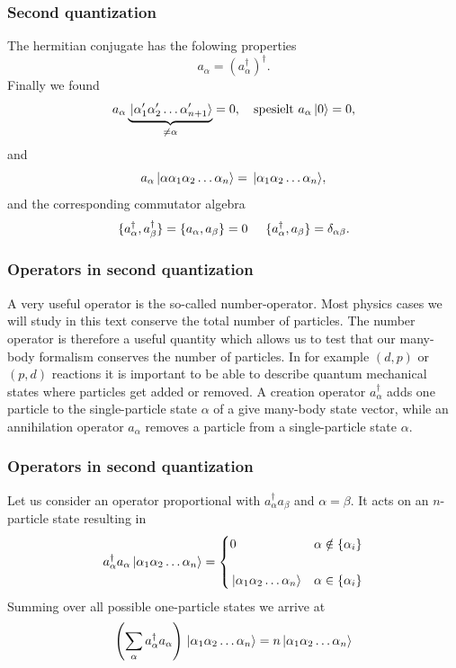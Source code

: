 \frame
{
  \frametitle{Second quantization}
\begin{small}
{\scriptsize
The hermitian conjugate has the folowing properties
\[
        a_{\alpha} = ( a_{\alpha}^\dagger )^\dagger.
\]
Finally we found 
\[
	a_\alpha\underbrace{\,|{\alpha_1'\alpha_2' \dots \alpha_{n+1}'}\rangle}_{\neq \alpha} = 0, \quad
		\textrm{spesielt } a_\alpha \,|{0}\rangle = 0,
\]
and 
\[
 a_\alpha \,|{\alpha\alpha_1\alpha_2 \dots \alpha_{n}}\rangle = \,|{\alpha_1\alpha_2 \dots \alpha_{n}}\rangle,
\]
and the corresponding commutator algebra
\[
	\{a_{\alpha}^\dagger,a_{\beta}^\dagger\} = \{a_{\alpha},a_{\beta}\} = 0 \hspace{0.5cm} 
\{a_\alpha^\dagger,a_\beta \} = \delta_{\alpha\beta}.
\]
}
\end{small}
}

\frame
{
  \frametitle{Operators in second quantization}
\begin{small}
{\scriptsize
A very useful operator is the so-called number-operator.  Most physics cases  we will
study in this text conserve the total number of particles.  The number operator is therefore
a useful quantity which allows us to test that our many-body formalism  conserves the number of particles.
In for example $(d,p)$ or $(p,d)$ reactions it is important to be able to describe quantum mechanical states
where particles get added or removed.
A creation operator $a_\alpha^\dagger$ adds one particle to the single-particle state
$\alpha$ of a give many-body state vector, while an annihilation operator $a_\alpha$ 
removes a particle from a single-particle
state $\alpha$. 
}
\end{small}
}


\frame
{
  \frametitle{Operators in second quantization}
\begin{small}
{\scriptsize
Let us consider an operator proportional with $a_\alpha^\dagger a_\beta$ and 
$\alpha=\beta$. It acts on an $n$-particle state 
resulting in
\begin{equation}
	a_\alpha^\dagger a_\alpha \,|{\alpha_1\alpha_2 \dots \alpha_{n}}\rangle = 
	\begin{cases}
		0  &\alpha \notin \{\alpha_i\} \\
		\\
		\,|{\alpha_1\alpha_2 \dots \alpha_{n}}\rangle & \alpha \in \{\alpha_i\}
	\end{cases}
\end{equation}
Summing over all possible one-particle states we arrive at
\begin{equation}
	\left( \sum_\alpha a_\alpha^\dagger a_\alpha \right) \ket{\alpha_1\alpha_2 \dots \alpha_{n}} = 
	n \ket{\alpha_1\alpha_2 \dots \alpha_{n}} \label{eq:2-21}
\end{equation}
}
\end{small}
}


